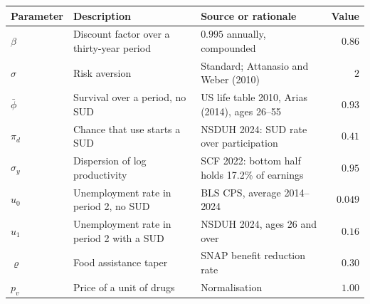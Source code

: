\footnotesize
\begin{tabular}{@{}lllr@{}}
\toprule
Parameter & Description & Source or rationale & Value \\
\midrule
$\beta$ & Discount factor over a thirty-year period & $0.995$ annually, compounded & $0.86$ \\
$\sigma$ & Risk aversion & Standard; Attanasio and Weber (2010) & $2$ \\
$\bar\phi$ & Survival over a period, no SUD & US life table 2010, Arias (2014), ages 26--55 & $0.93$ \\
$\pi_d$ & Chance that use starts a SUD & NSDUH 2024: SUD rate over participation & $0.41$ \\
$\sigma_y$ & Dispersion of log productivity & SCF 2022: bottom half holds 17.2\% of earnings & $0.95$ \\
$u_0$ & Unemployment rate in period 2, no SUD & BLS CPS, average 2014--2024 & $0.049$ \\
$u_1$ & Unemployment rate in period 2 with a SUD & NSDUH 2024, ages 26 and over & $0.16$ \\
$\varrho$ & Food assistance taper & SNAP benefit reduction rate & $0.30$ \\
$p_v$ & Price of a unit of drugs & Normalisation & $1.00$ \\
\bottomrule
\end{tabular}
